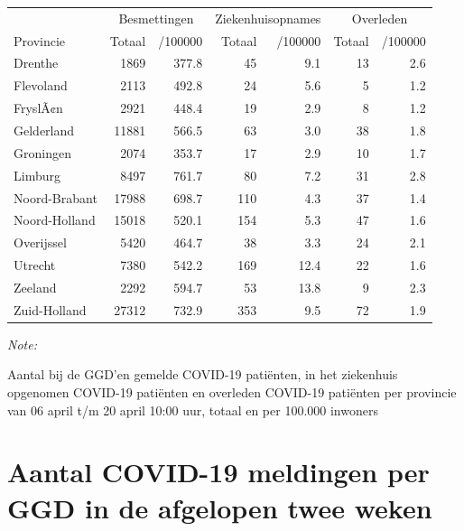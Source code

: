 \documentclass[
  english,
  man,floatsintext]{apa6}
\begin{document}
\begin{table}
\centering
\begin{threeparttable}
\begin{tabular}{lrrrrrr}
\toprule
\multicolumn{1}{c}{ } & \multicolumn{2}{c}{Besmettingen} & \multicolumn{2}{c}{Ziekenhuisopnames} & \multicolumn{2}{c}{Overleden} \\
\cmidrule(l{3pt}r{3pt}){2-3} \cmidrule(l{3pt}r{3pt}){4-5} \cmidrule(l{3pt}r{3pt}){6-7}
Provincie & Totaal & /100000 & Totaal & /100000 & Totaal & /100000\\
\midrule
Drenthe & 1869 & 377.8 & 45 & 9.1 & 13 & 2.6\\
Flevoland & 2113 & 492.8 & 24 & 5.6 & 5 & 1.2\\
FryslÃ¢n & 2921 & 448.4 & 19 & 2.9 & 8 & 1.2\\
Gelderland & 11881 & 566.5 & 63 & 3.0 & 38 & 1.8\\
Groningen & 2074 & 353.7 & 17 & 2.9 & 10 & 1.7\\
Limburg & 8497 & 761.7 & 80 & 7.2 & 31 & 2.8\\
Noord-Brabant & 17988 & 698.7 & 110 & 4.3 & 37 & 1.4\\
Noord-Holland & 15018 & 520.1 & 154 & 5.3 & 47 & 1.6\\
Overijssel & 5420 & 464.7 & 38 & 3.3 & 24 & 2.1\\
Utrecht & 7380 & 542.2 & 169 & 12.4 & 22 & 1.6\\
Zeeland & 2292 & 594.7 & 53 & 13.8 & 9 & 2.3\\
Zuid-Holland & 27312 & 732.9 & 353 & 9.5 & 72 & 1.9\\
\bottomrule
\end{tabular}
\begin{tablenotes}
\item \textit{Note: } 
\item Aantal bij de GGD’en gemelde COVID-19 patiënten, in het ziekenhuis opgenomen COVID-19 patiënten en overleden COVID-19 patiënten per provincie van 06 april t/m 20 april 10:00 uur, totaal en per 100.000 inwoners
\end{tablenotes}
\end{threeparttable}
\end{table}

\newpage

\hypertarget{aantal-covid-19-meldingen-per-ggd-in-de-afgelopen-twee-weken}{%
\section{Aantal COVID-19 meldingen per GGD in de afgelopen twee weken}\label{aantal-covid-19-meldingen-per-ggd-in-de-afgelopen-twee-weken}}
\end{document}
